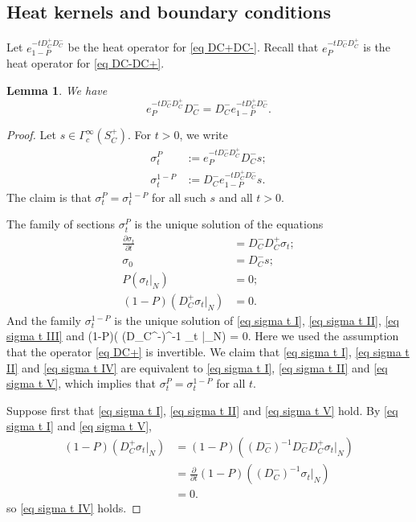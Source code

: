\documentclass[11pt]{article}
\theoremstyle{plain}
\newtheorem{lemma}[theorem]{Lemma}
\theoremstyle{definition}
\theoremstyle{remark}
\numberwithin{equation}{section}
\begin{document}
\subsection{Heat kernels and boundary conditions}\label{sec heat bdry}

Let $e_{1-P}^{-tD_C^+ D_C^-}$ be the heat operator for \eqref{eq DC+DC-}. Recall that $e_{P}^{-t D_C^- D_C^+}$ is the heat operator for  \eqref{eq DC-DC+}.
\begin{lemma}\label{lem heat P 1-P}
We have
\[
e_{P}^{-tD_C^- D_C^+} D_C^- = D_C^- e_{1-P}^{-tD_C^+ D_C^-}.
\]
\end{lemma}
\begin{proof}
Let $s \in \Gamma^{\infty}_c(S_C^+)$. For $t>0$, we write
\[
\begin{split}
\sigma_t^P &:=  e_{P}^{-tD_C^- D_C^+} D_C^- s;\\
\sigma_t^{1-P} &:= D_C^- e_{1-P}^{-tD_C^+ D_C^-} s.
\end{split}
\]
The claim is that $\sigma^P_t = \sigma^{1-P}_t$ for all such $s$ and all $t>0$.

The family of sections $\sigma_t^P$ is the unique solution of the equations
\begin{align}
\frac{\partial \sigma_t}{\partial t} &= D_C^- D_C^+ \sigma_t; \label{eq sigma t I}\\
\sigma_0 &= D_C^- s; \label{eq sigma t II}\\
P(  \sigma_t |_N) &= 0; \label{eq sigma t III}\\
(1-P)( D_C^+  \sigma_t |_N) &= 0. \label{eq sigma t IV}
\end{align}
And the family $\sigma^{1-P}_t$ is the unique solution of \eqref{eq sigma t I}, \eqref{eq sigma t II}, \eqref{eq sigma t III} and
(1-P)( (D_C^-)^{-1}  \sigma_t |_N) = 0.
\eeq
Here we used the assumption that the operator \eqref{eq DC+} is invertible.
We claim that \eqref{eq sigma t I}, \eqref{eq sigma t II} and \eqref{eq sigma t IV} are equivalent to \eqref{eq sigma t I}, \eqref{eq sigma t II} and \eqref{eq sigma t V}, which implies that $\sigma^P_t = \sigma^{1-P}_t$ for all $t$.

Suppose first that \eqref{eq sigma t I}, \eqref{eq sigma t II} and \eqref{eq sigma t V} hold. By \eqref{eq sigma t I}  and \eqref{eq sigma t V},
\[
\begin{split}
(1-P)( D_C^+  \sigma_t |_N)& = (1-P)( (D_C^-)^{-1} D_C^- D_C^+  \sigma_t |_N) \\
&= \frac{\partial}{\partial t}(1-P)( (D_C^-)^{-1}   \sigma_t |_N) \\
&= 0.
\end{split}
\]
so \eqref{eq sigma t IV} holds.


\end{proof}
\end{document}
